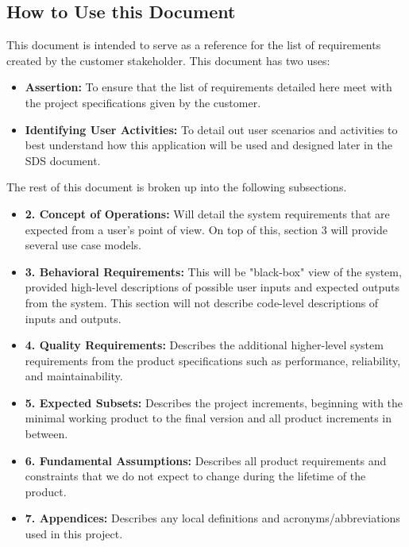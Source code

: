 \documentclass[a4paper, 11pt]{article}
\begin{document}
\subsection{How to Use this Document}
This document is intended to serve as a reference for the list of requirements created by the customer stakeholder. This document has two uses:
\begin{itemize}
	\item \textbf{Assertion:} To ensure that the list of requirements detailed here meet with the project specifications given by the customer.
	\item \textbf{Identifying User Activities:} To detail out user scenarios and activities to best understand how this application will be used and designed later in the SDS document.
\end{itemize}
The rest of this document is broken up into the following subsections.
\begin{itemize}
	\item \textbf{2. Concept of Operations:} Will detail the system requirements that are expected from a user's point of view. On top of this, section 3 will provide several use case models.
	\item \textbf{3. Behavioral Requirements:} This will be  "black-box" view of the system, provided high-level descriptions of possible user inputs and expected outputs from the system. This section will not describe code-level descriptions of inputs and outputs.
	\item \textbf{4. Quality Requirements:} Describes the additional higher-level system requirements from the product specifications such as performance, reliability, and maintainability.
	\item \textbf{5. Expected Subsets:} Describes the project increments, beginning with the minimal working product to the final version and all product increments in between.
	\item \textbf{6. Fundamental Assumptions:} Describes all product requirements and constraints that we do not expect to change during the lifetime of the product.
	\item \textbf{7. Appendices:} Describes any local definitions and acronyms/abbreviations used in this project.
\end{itemize}
\end{document}
